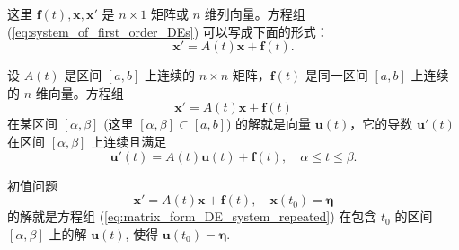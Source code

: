这里 $\mathbf{f}(t), \mathbf{x}, \mathbf{x}'$ 是 $n \times 1$ 矩阵或 $n$ 维列向量。方程组 (\ref{eq:system_of_first_order_DEs}) 可以写成下面的形式：
\begin{equation}
\mathbf{x}' = A(t)\mathbf{x}+\mathbf{f}(t). \label{eq:matrix_form_DE_system}
\end{equation}

\begin{definition}[线性微分方程组的解]\label{def:solution_linear_DE_system}
设 $A(t)$ 是区间 $[a,b]$ 上连续的 $n \times n$ 矩阵，$\mathbf{f}(t)$ 是同一区间 $[a,b]$ 上连续
的 $n$ 维向量。方程组
\begin{equation}
\mathbf{x}' = A(t)\mathbf{x}+\mathbf{f}(t) \label{eq:matrix_form_DE_system_repeated}
\end{equation}
在某区间 $[\alpha,\beta]$ (这里 $[\alpha,\beta] \subset [a,b]$) 的解就是向量 $\mathbf{u}(t)$，它的导数 $\mathbf{u}'(t)$ 在区间 $[\alpha,
\beta]$ 上连续且满足
$$\mathbf{u}'(t) = A(t)\mathbf{u}(t)+\mathbf{f}(t), \quad \alpha \le t \le \beta.$$
\end{definition}

\begin{definition}[初值问题]\label{def:initial_value_problem}
初值问题
\begin{equation}
\mathbf{x}' = A(t)\mathbf{x}+\mathbf{f}(t), \quad \mathbf{x}(t_0)=\boldsymbol{\eta} \label{eq:initial_value_problem_system}
\end{equation}
的解就是方程组 (\ref{eq:matrix_form_DE_system_repeated}) 在包含 $t_0$ 的区间 $[\alpha,\beta]$ 上的解 $\mathbf{u}(t)$, 使得 $\mathbf{u}(t_0)=\boldsymbol{\eta}$.
\end{definition}

